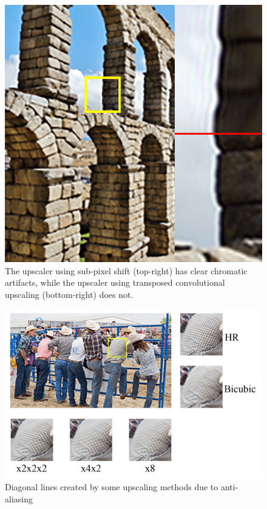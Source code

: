 \documentclass[10pt,twocolumn,letterpaper]{article}
\begin{document}
\begin{itemize}
	\begin{figure}[htbp]
	    \centering
	    \includegraphics[width=\columnwidth]{Images/artifacts.png}
	    \caption{The upscaler using sub-pixel shift (top-right) has clear chromatic artifacts, while the upscaler using transposed convolutional upscaling (bottom-right) does not.}
	    \label{fig:artifacts}
	\end{figure}
	
	\begin{figure}[htbp]
	    \centering
	    \includegraphics[width=\columnwidth]{Images/Stripes.png}
	    \caption{Diagonal lines created by some upscaling methods due to anti-aliasing}
	    \label{fig:antialias}
	\end{figure}
	

\end{itemize}
\end{document}
